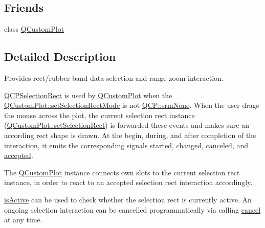 \subsection*{Friends}
\begin{DoxyCompactItemize}
\item 
class \mbox{\hyperlink{class_q_c_p_selection_rect_a1cdf9df76adcfae45261690aa0ca2198}{Q\+Custom\+Plot}}
\end{DoxyCompactItemize}


\subsection{Detailed Description}
Provides rect/rubber-\/band data selection and range zoom interaction. 

\mbox{\hyperlink{class_q_c_p_selection_rect}{Q\+C\+P\+Selection\+Rect}} is used by \mbox{\hyperlink{class_q_custom_plot}{Q\+Custom\+Plot}} when the \mbox{\hyperlink{class_q_custom_plot_a810ef958ebe84db661c7288b526c0deb}{Q\+Custom\+Plot\+::set\+Selection\+Rect\+Mode}} is not \mbox{\hyperlink{namespace_q_c_p_ac9aa4d6d81ac76b094f9af9ad2d3aacfa9032f170490d67240a6c68c2638ffab1}{Q\+C\+P\+::srm\+None}}. When the user drags the mouse across the plot, the current selection rect instance (\mbox{\hyperlink{class_q_custom_plot_a0c09f96df15faa4799ad7051bb16cf33}{Q\+Custom\+Plot\+::set\+Selection\+Rect}}) is forwarded these events and makes sure an according rect shape is drawn. At the begin, during, and after completion of the interaction, it emits the corresponding signals \mbox{\hyperlink{class_q_c_p_selection_rect_a7b7162d19f4f2174d3644ff1a5d335aa}{started}}, \mbox{\hyperlink{class_q_c_p_selection_rect_a1bab11026bca52740c2e6682623e6964}{changed}}, \mbox{\hyperlink{class_q_c_p_selection_rect_aeb82009393c90130102dccf36477b906}{canceled}}, and \mbox{\hyperlink{class_q_c_p_selection_rect_a15a43542e1f7b953a44c260b419e6d2c}{accepted}}.

The \mbox{\hyperlink{class_q_custom_plot}{Q\+Custom\+Plot}} instance connects own slots to the current selection rect instance, in order to react to an accepted selection rect interaction accordingly.

\mbox{\hyperlink{class_q_c_p_selection_rect_ad27c1569c6ea8fa48e24b81e2a302df3}{is\+Active}} can be used to check whether the selection rect is currently active. An ongoing selection interaction can be cancelled programmatically via calling \mbox{\hyperlink{class_q_c_p_selection_rect_af67bc58f4f5ce9a4dc420b9c42de235a}{cancel}} at any time.

